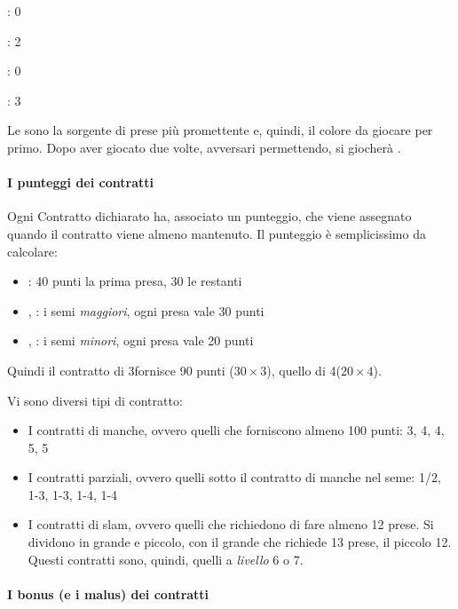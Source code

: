 \documentclass[../corsofiori.tex]{subfiles}
\begin{document}
\Sp: 0

\He: 2

\Di: 0

\Cl: 3

Le \fio sono la sorgente di prese più promettente e, quindi, il colore da giocare per primo. Dopo aver giocato
\fio
due volte, avversari permettendo, si giocherà \cu.
\newgame


\paragraph{I punteggi dei contratti}

Ogni Contratto dichiarato ha, associato un punteggio, che viene assegnato quando il contratto viene almeno mantenuto. Il
punteggio è semplicissimo da calcolare:

\begin{itemize}
    \item \SA: 40 punti la prima presa, 30 le restanti
    \item \Sp, \He: i semi \emph{maggiori}, ogni presa vale 30 punti
    \item \Di, \Cl: i semi \emph{minori}, ogni presa vale 20 punti
\end{itemize}

Quindi il contratto di 3\He fornisce 90 punti ($30 \times 3$), quello di 4\Cl ($20 \times 4$).

Vi sono diversi tipi di contratto:

\begin{itemize}
    \item I contratti di manche, ovvero quelli che forniscono almeno 100 punti: 3\SA, 4\Sp, 4\He, 5\Di, 5\Cl
    \item I contratti parziali, ovvero quelli sotto il contratto di manche nel seme: 1/2\SA, 1-3\Sp, 1-3\He, 1-4\Di,
        1-4\Cl
    \item I contratti di slam, ovvero quelli che richiedono di fare almeno 12 prese. Si dividono in grande e piccolo,
        con il grande che richiede 13 prese, il piccolo 12. Questi contratti sono, quindi, quelli a
        \emph{livello} 6 o
        7.
\end{itemize}

\paragraph{I bonus (e i malus) dei contratti}
\end{document}
